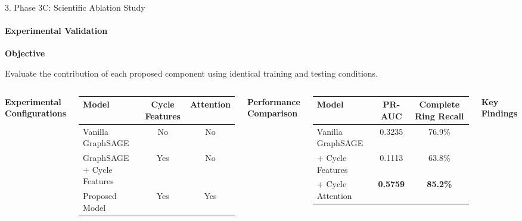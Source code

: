 \documentclass[aspectratio=169,11pt]{beamer}
\begin{document}
\begin{frame}{3. Phase 3C: Scientific Ablation Study}

\framesubtitle{Experimental Validation}

{\footnotesize
\textbf{Objective}

Evaluate the contribution of each proposed component using identical training and testing conditions.
}

\vspace{0.15cm}

\begin{columns}[T]


{\footnotesize\textbf{Experimental Configurations}}\par
\vspace{0.06cm}
\centering
\setlength{\tabcolsep}{3pt}
\renewcommand{\arraystretch}{1.05}
\scriptsize

\begin{tabular}{|l|c|c|}
\hline
\textbf{Model} & \textbf{Cycle Features} & \textbf{Attention} \\
\hline
Vanilla GraphSAGE & No & No \\
\hline
GraphSAGE + Cycle Features & Yes & No \\
\hline
Proposed Model & Yes & Yes \\
\hline
\end{tabular}

\vspace{0.2cm}
\raggedright
{\footnotesize\textbf{Performance Comparison}}\par
\vspace{0.06cm}
\centering
\setlength{\tabcolsep}{3pt}
\renewcommand{\arraystretch}{1.05}
\scriptsize

\begin{tabular}{|l|c|c|}
\hline
\textbf{Model} & \textbf{PR-AUC} & \textbf{Complete Ring Recall} \\
\hline
Vanilla GraphSAGE & 0.3235 & 76.9\% \\
\hline
+ Cycle Features & 0.1113 & 63.8\% \\
\hline
+ Cycle Attention & \textbf{0.5759} & \textbf{85.2\%} \\
\hline
\end{tabular}


\raggedright
{\footnotesize
\textbf{Key Findings}

}
\end{columns}
\end{frame}
\end{document}
